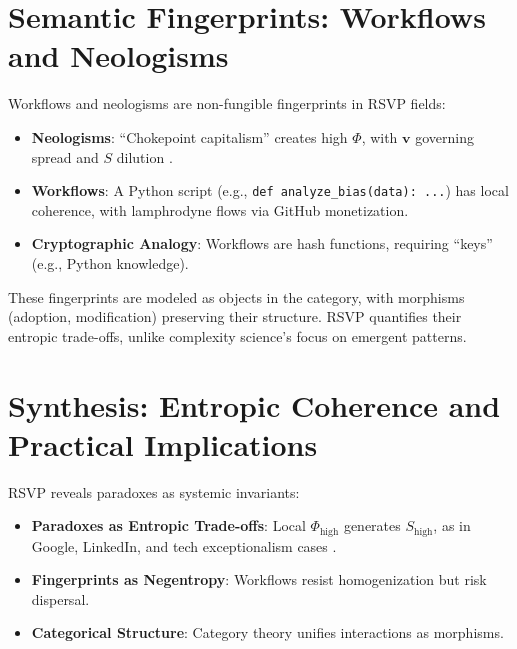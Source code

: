 \documentclass{article}
\begin{document}
\section{Semantic Fingerprints: Workflows and Neologisms}

Workflows and neologisms are non-fungible fingerprints in RSVP fields:

\begin{itemize}
    \item \textbf{Neologisms}: ``Chokepoint capitalism'' creates high $\Phi$, with $\mathbf{v}$ governing spread and $S$ dilution \cite{giblin2022chokepoint,doctorow2023internetcon}.
    \item \textbf{Workflows}: A Python script (e.g., \texttt{def analyze\_bias(data): ...}) has local coherence, with lamphrodyne flows via GitHub monetization.
    \item \textbf{Cryptographic Analogy}: Workflows are hash functions, requiring ``keys'' (e.g., Python knowledge).
\end{itemize}

These fingerprints are modeled as objects in the category, with morphisms (adoption, modification) preserving their structure. RSVP quantifies their entropic trade-offs, unlike complexity science’s focus on emergent patterns.

\section{Synthesis: Entropic Coherence and Practical Implications}
\label{sec:synthesis}

RSVP reveals paradoxes as systemic invariants:

\begin{itemize}
    \item \textbf{Paradoxes as Entropic Trade-offs}: Local $\Phi_{\text{high}}$ generates $S_{\text{high}}$, as in Google, LinkedIn, and tech exceptionalism cases \cite{doctorow2023internetcon,amos2024}.
    \item \textbf{Fingerprints as Negentropy}: Workflows resist homogenization but risk dispersal.
    \item \textbf{Categorical Structure}: Category theory unifies interactions as morphisms.
\end{itemize}
\end{document}
